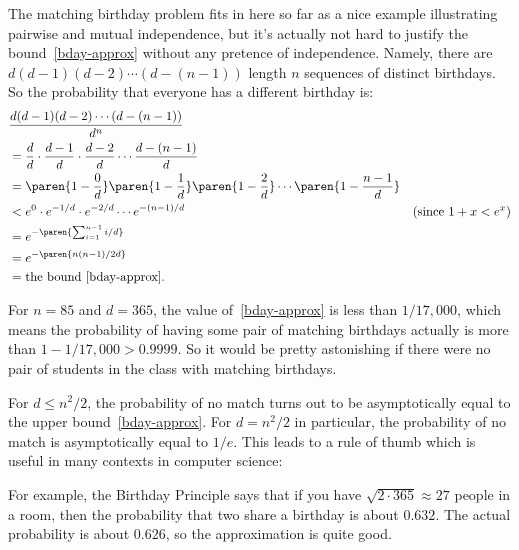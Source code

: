 The matching birthday problem fits in here so far as a nice example
illustrating pairwise and mutual independence, but it's actually not
hard to justify the bound~\eqref{bday-approx} without any pretence of
independence.  Namely, there are $d (d - 1) (d - 2) \cdots (d - (n -
1))$ length $n$ sequences of distinct birthdays.  So the probability
that everyone has a different birthday is:
\begin{align*}
\lefteqn{\frac{d (d - 1) (d - 2) \cdots (d - (n - 1))}{d^n}}\\
   & = \frac{d}{d} \cdot \frac{d-1}{d} \cdot \frac{d-2}{d} \cdots \frac{d - (n - 1)}{d}\\
   & = \paren{1 - \frac{0}{d}}
             \paren{1 - \frac{1}{d}}
             \paren{1 - \frac{2}{d}}
             \cdots
             \paren{1 - \frac{n - 1}{d}}\\
   & < e^0 \cdot e^{-1/d} \cdot e^{-2/d} \cdots e^{-(n-1)/d} 
             & \text{(since $1+x < e^x$)} \\
   & = e^{-\paren{\sum_{i=1}^{n-1} i/d}}\\
   & = e^{-\paren{n(n-1)/2d}}\\
   & = \text{the bound~\eqref{bday-approx}}.
\end{align*}

For $n=85$ and $d = 365$, the value of~\eqref{bday-approx} is less
than $1/17,000$, which means the probability of having some pair of
matching birthdays actually is more than $1 - 1/17,000 > 0.9999$.  So
it would be pretty astonishing if there were no pair of students in
the class with matching birthdays.

For $d \leq n^2/2$, the probability of no match turns out to be
asymptotically equal to the upper bound~\eqref{bday-approx}.  For $d =
n^2/2$ in particular, the probability of no match is asymptotically
equal to $1/e$.  This leads to a rule of thumb which is useful in many
contexts in computer science:


For example, the Birthday Principle says that if you have $\sqrt{2
  \cdot 365} \approx 27$ people in a room, then the probability that
two share a birthday is about $0.632$.  The actual probability is
about $0.626$, so the approximation is quite good.


